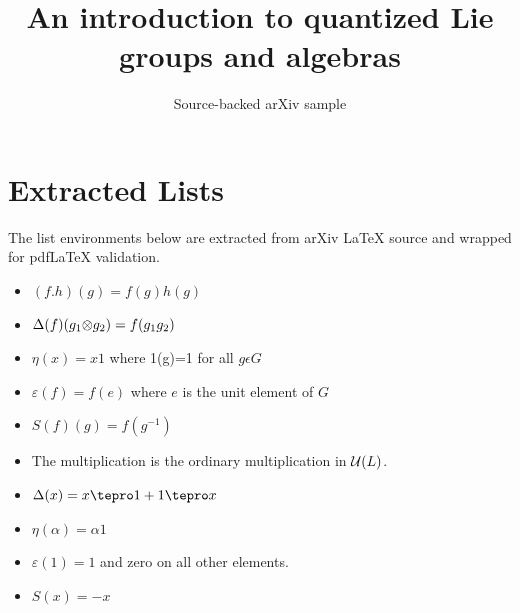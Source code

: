 \documentclass[11pt]{article}
\title{An introduction to quantized Lie groups and algebras}
\author{Source-backed arXiv sample}
\date{}
\begin{document}
\maketitle
\section{Extracted Lists}

The list environments below are extracted from arXiv LaTeX source and wrapped for pdfLaTeX validation.

\begin{itemize}
\item $(f.h)(g)=f(g)h(g)$
\item $\Delta (f)(g_1 {\bf \otimes }g_2)=f(g_1 g_2)
$
\item $\eta (x) =x1$ where 1(g)=1 for all $g \epsilon G
$
\item $\varepsilon (f)=f(e)$ where $e$ is the unit element of
$G$
\item $S(f)(g)=f(g^{-1})$
\end{itemize}

\begin{itemize}
\item The multiplication is the ordinary multiplication in
${\cal U}(L)$.
\item $\Delta (x)=x \tepro 1 + 1\tepro x$
\item $\eta (\alpha)= \alpha 1$
\item $\varepsilon (1)=1$ and zero on all other elements.
\item $S(x)=-x$
\end{itemize}
\end{document}
